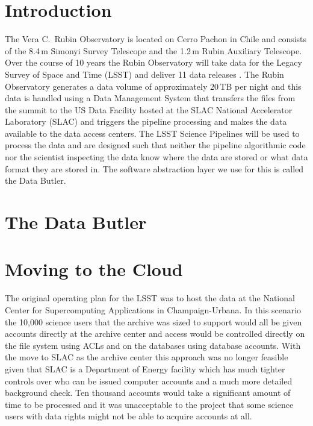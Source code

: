 \section{Introduction}

The Vera C.\ Rubin Observatory is located on Cerro Pachon in Chile and consists of the 8.4\,m Simonyi Survey Telescope and the 1.2\,m Rubin Auxiliary Telescope.
Over the course of 10 years the Rubin Observatory will take data for the Legacy Survey of Space and Time (LSST) and deliver 11 data releases \cite{2019ApJ...873..111I}.
The Rubin Observatory generates a data volume of approximately 20\,TB per night and this data is handled using a Data Management System \cite{2022arXiv221113611O} that transfers the files from the summit to the US Data Facility hosted at the SLAC National Accelerator Laboratory (SLAC) and triggers the pipeline processing and makes the data available to the data access centers.
The LSST Science Pipelines \cite{2019ASPC..523..521B} will be used to process the data and are designed such that neither the pipeline algorithmic code nor the scientist inspecting the data know where the data are stored or what data format they are stored in.
The software abstraction layer we use for this is called the Data Butler. \cite{2019ASPC..523..653J,2022SPIE12189E..11J}

\section{The Data Butler}


\section{Moving to the Cloud}

The original operating plan for the LSST was to host the data at the National Center for Supercomputing Applications in Champaign-Urbana. \cite{2012SPIE.8451E..0VF}
In this scenario the 10,000 science users that the archive was sized to support would all be given accounts directly at the archive center and access would be controlled directly on the file system using ACLs and on the databases using database accounts.
With the move to SLAC as the archive center this approach was no longer feasible given that SLAC is a Department of Energy facility which has much tighter controls over who can be issued computer accounts and a much more detailed background check.
Ten thousand accounts would take a significant amount of time to be processed and it was unacceptable to the project that some science users with data rights might not be able to acquire accounts at all.

